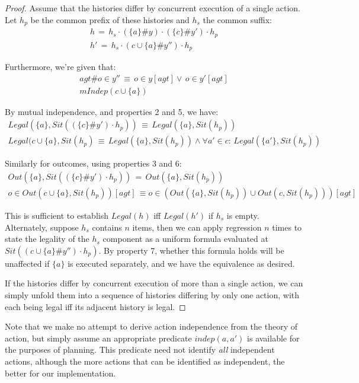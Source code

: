 \begin{proof}
Assume that the histories differ by concurrent execution of a single
action. Let $h_{p}$ be the common prefix of these histories and $h_{s}$
the common suffix:\begin{gather*}
h\,=\, h_{s}\cdot(\{a\}\#y)\cdot(\{c\}\#y')\cdot h_{p}\\
h'\,=\, h_{s}\cdot(c\cup\{a\}\#y'')\cdot h_{p}\end{gather*}


Furthermore, we're given that:\begin{gather*}
agt\#o\in y''\,\equiv\, o\in y[agt]\vee\, o\in y'[agt]\\
mIndep(c\cup\{a\})\end{gather*}


By mutual independence, and properties 2 and 5, we have: \begin{gather*}
Legal(\{a\},Sit((\{c\}\#y')\cdot h_{p}))\,\equiv\, Legal(\{a\},Sit(h_{p}))\\
Legal(c\cup\{a\},Sit(h_{p})\,\equiv\, Legal(\{a\},Sit(h_{p}))\wedge\forall a'\in c:\, Legal(\{a'\},Sit(h_{p}))\end{gather*}


Similarly for outcomes, using properties 3 and 6:\begin{gather*}
Out(\{a\},Sit((\{c\}\#y')\cdot h_{p}))\,=\, Out(\{a\},Sit(h_{p}))\\
o\in Out(c\cup\{a\},Sit(h_{p}))[agt]\,\equiv o\in\left(Out(\{a\},Sit(h_{p}))\cup Out(c,Sit(h_{p}))\right)[agt]\end{gather*}


This is sufficient to establish $Legal(h)$ iff $Legal(h')$ if $h_{s}$
is empty. Alternately, suppose $h_{s}$ contains $n$ items, then
we can apply regression $n$ times to state the legality of the $h_{s}$
component as a uniform formula evaluated at $Sit((c\cup\{a\}\#y'')\cdot h_{p})$.
By property 7, whether this formula holds will be unaffected if $\{a\}$
is executed separately, and we have the equivalence as desired.

If the histories differ by concurrent execution of more than a single
action, we can simply unfold them into a sequence of histories differing
by only one action, with each being legal iff its adjacent history
is legal.
\end{proof}
Note that we make no attempt to derive action independence from the
theory of action, but simply assume an appropriate predicate $indep(a,a')$
is available for the purposes of planning. This predicate need not
identify \emph{all }independent actions, although the more actions
that can be identified as independent, the better for our implementation.



